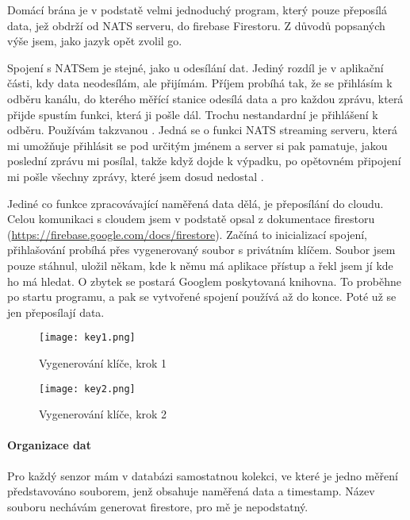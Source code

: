Domácí brána je v podstatě velmi jednoduchý program, který pouze přeposílá data, jež obdrží od NATS serveru, do 
\gls{firebase} Firestoru. Z důvodů popsaných výše jsem, jako jazyk opět zvolil \gls{go}.


Spojení s NATSem je stejné, jako u odesílání dat. Jediný rozdíl je v aplikační části, kdy data neodesílám, ale přijímám. 
Příjem probíhá tak, že se přihlásím k odběru kanálu, do kterého měřící stanice odesílá data a pro každou zprávu, která 
přijde spustím funkci, která ji pošle dál. Trochu nestandardní je přihlášení k odběru. Používám takzvanou . Jedná se o funkci NATS streaming serveru, která mi umožňuje přihlásit se pod určitým jménem a server si 
pak pamatuje, jakou poslední zprávu mi posílal, takže když dojde k výpadku, po opětovném připojení mi pošle všechny 
zprávy, které jsem dosud nedostal \parencite{root.cz:NATS-streaming}.

Jediné co funkce zpracovávající naměřená data dělá, je přeposílání do cloudu. Celou komunikaci s cloudem jsem v podstatě 
opsal z dokumentace firestoru (\url{https://firebase.google.com/docs/firestore}). Začíná to inicializací spojení, 
přihlašování probíhá přes vygenerovaný soubor s privátním klíčem. Soubor jsem pouze stáhnul, uložil někam, kde k němu má 
aplikace přístup a řekl jsem jí kde ho má hledat. O zbytek se postará Googlem poskytovaná \gls{knihovna}. To proběhne po 
startu programu, a pak se vytvořené spojení používá až do konce. Poté už se jen přeposílají data.

\begin{figure}[H]
    \centering
    \texttt{[image: key1.png]}
    \caption{Vygenerování klíče, krok 1}
\end{figure}
\begin{figure}[H]
    \centering
    \texttt{[image: key2.png]}
    \caption{Vygenerování klíče, krok 2}
\end{figure}

\paragraph*{Organizace dat}
Pro každý senzor mám v databázi samostatnou kolekci, ve které je jedno měření představováno souborem, jenž obsahuje 
naměřená data a \gls{timestamp}. Název souboru nechávám generovat firestore, pro mě je nepodstatný.
